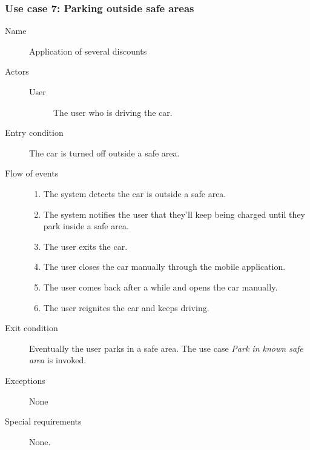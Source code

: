 	\subsubsection{Use case 7: Parking outside safe areas}
		\begin{description}
			\item[Name] Application of several discounts
			\item[Actors] \hfill
				\begin{description}
					\item[User] The user who is driving the car.
				\end{description}
			\item[Entry condition] The car is turned off outside a safe area.
			\item[Flow of events]
				\begin{enumerate}
					\item The system detects the car is outside a safe area.
					\item The system notifies the user that they'll keep being charged until they park inside a safe area.
					\item The user exits the car.
					\item The user closes the car manually through the mobile application.
					\item The user comes back after a while and opens the car manually.
					\item The user reignites the car and keeps driving.
				\end{enumerate}
			\item[Exit condition] Eventually the user parks in a safe area. The use case \textit{Park in known safe area} is invoked.
			\item[Exceptions] None
			\item[Special requirements] None. %
		\end{description}		

